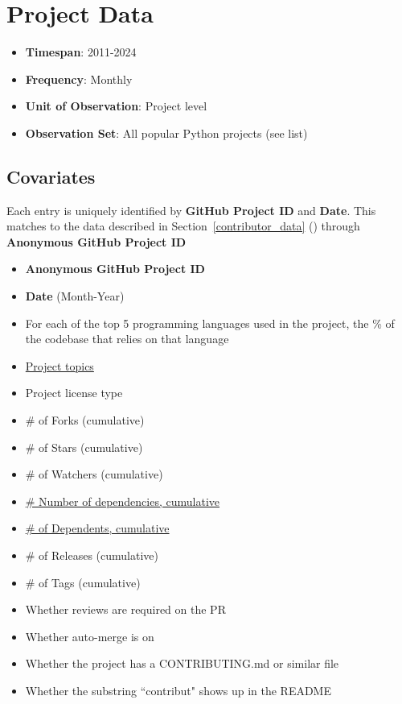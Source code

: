 \documentclass[12pt,notitlepage]{article}
\begin{document}
\section{Project Data} \label{project_data}
\begin{itemize}
    \item \textbf{Timespan}: 2011-2024
    \item \textbf{Frequency}: Monthly
    \item \textbf{Unit of Observation}: Project level
    \item \textbf{Observation Set}: All popular Python projects (see list)
\end{itemize}
\subsection*{Covariates}
Each entry is uniquely identified by \textbf{GitHub Project ID} and \textbf{Date}. 
This matches to the data described in Section~\ref{contributor_data} () through \textbf{Anonymous GitHub Project ID}
\begin{itemize}
    \item \textbf{Anonymous GitHub Project ID}
    \item \textbf{Date} (Month-Year)
    \item For each of the top 5 programming languages used in the project, the \% of the codebase that relies on that language
    \item \href{https://docs.github.com/en/repositories/managing-your-repositorys-settings-and-features/customizing-your-repository/classifying-your-repository-with-topics}{Project topics}
    \item Project license type
    \item \# of Forks (cumulative)
    \item \# of Stars (cumulative)
    \item \# of Watchers (cumulative)
    \item \href{https://GitHub.com/pandas-dev/pandas/network/dependencies}{\# Number of dependencies, cumulative}
    \item \href{https://GitHub.com/pandas-dev/pandas/network/dependents}{\# of Dependents, cumulative}
    \item \# of Releases (cumulative)
    \item \# of Tags (cumulative)
    \item Whether reviews are required on the PR
    \item Whether auto-merge is on
    \item Whether the project has a CONTRIBUTING.md or similar file
    \item Whether the substring ``contribut" shows up in the README
    
\end{itemize}
\end{document}
